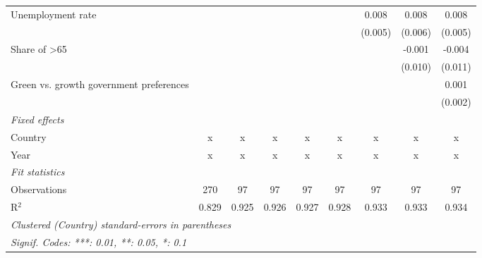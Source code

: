 \begin{table}[htbp]
\begin{tabular}{lcccccccc}
      Unemployment rate                       &         &         &         &             &             & 0.008       & 0.008        & 0.008\\   
                                              &         &         &         &             &             & (0.005)     & (0.006)      & (0.005)\\   
      Share of >65                            &         &         &         &             &             &             & -0.001       & -0.004\\   
                                              &         &         &         &             &             &             & (0.010)      & (0.011)\\   
      Green vs. growth government preferences &         &         &         &             &             &             &              & 0.001\\   
                                              &         &         &         &             &             &             &              & (0.002)\\   
      \emph{Fixed effects}\\
      Country                                 & x       & x       & x       & x           & x           & x           & x            & x\\  
      Year                                    & x       & x       & x       & x           & x           & x           & x            & x\\  
      \midrule \emph{Fit statistics}\\
      Observations                            & 270     & 97      & 97      & 97          & 97          & 97          & 97           & 97\\  
      R$^2$                                   & 0.829   & 0.925   & 0.926   & 0.927       & 0.928       & 0.933       & 0.933        & 0.934\\  
      \midrule
      \multicolumn{9}{l}{\emph{Clustered (Country) standard-errors in parentheses}}\\
      \multicolumn{9}{l}{\emph{Signif. Codes: ***: 0.01, **: 0.05, *: 0.1}}\\
   \end{tabular}
\end{table}


